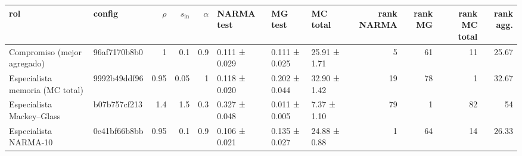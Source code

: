 \begin{tabular}{llrrrlllrrrr}
\toprule
rol & config & $\rho$ & $s_{\mathrm{in}}$ & $\alpha$ & NARMA test & MG test & MC total & rank NARMA & rank MG & rank MC total & rank agg. \\
\midrule
Compromiso (mejor agregado) & 96af7170b8b0 & 1 & 0.1 & 0.9 & 0.111 ± 0.029 & 0.111 ± 0.025 & 25.91 ± 1.71 & 5 & 61 & 11 & 25.67 \\
Especialista memoria (MC total) & 9992b49ddf96 & 0.95 & 0.05 & 1 & 0.118 ± 0.020 & 0.202 ± 0.044 & 32.90 ± 1.42 & 19 & 78 & 1 & 32.67 \\
Especialista Mackey–Glass & b07b757cf213 & 1.4 & 1.5 & 0.3 & 0.327 ± 0.048 & 0.011 ± 0.005 & 7.37 ± 1.10 & 79 & 1 & 82 & 54 \\
Especialista NARMA-10 & 0e41bf66b8bb & 0.95 & 0.1 & 0.9 & 0.106 ± 0.021 & 0.135 ± 0.027 & 24.88 ± 0.88 & 1 & 64 & 14 & 26.33 \\
\bottomrule
\end{tabular}
